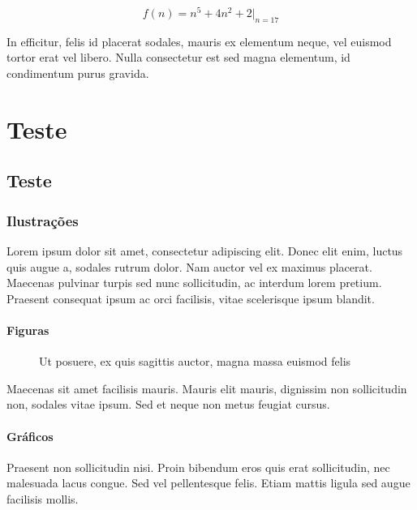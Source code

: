 \documentclass{uecetex2}
\begin{document}
	\begin{equation}
		f(n) = n^5 + 4n^2 + 2 |_{n=17}
	\end{equation}
	
	In efficitur, felis id placerat sodales, mauris ex elementum neque, vel euismod tortor erat vel libero. Nulla consectetur est sed magna elementum, id condimentum purus gravida. 
	
	\chapter{Teste}
	\section{Teste}	\lipsum[1]
	
	\subsection{Ilustrações}
	
	Lorem ipsum dolor sit amet, consectetur adipiscing elit. Donec elit enim, luctus quis augue a, sodales rutrum dolor. Nam auctor vel ex maximus placerat. Maecenas pulvinar turpis sed nunc sollicitudin, ac interdum lorem pretium. Praesent consequat ipsum ac orci facilisis, vitae scelerisque ipsum blandit.
	
	\subsubsection{Figuras}
	
	\begin{figure}[h!]
		\centering
		\caption{\label{fig:example-1} Ut posuere, ex quis sagittis auctor, magna massa euismod felis}	
	\end{figure}

	Maecenas sit amet facilisis mauris. Mauris elit mauris, dignissim non sollicitudin non, sodales vitae ipsum. Sed et neque non metus feugiat cursus.

	\subsubsection{Gráficos}
	
	Praesent non sollicitudin nisi. Proin bibendum eros quis erat sollicitudin, nec malesuada lacus congue. Sed vel pellentesque felis. Etiam mattis ligula sed augue facilisis mollis.
	
\end{document}
